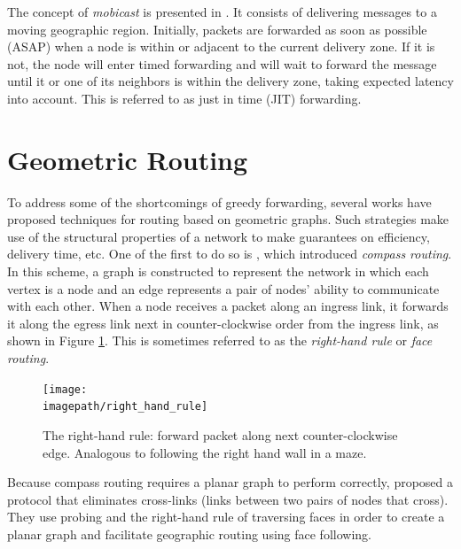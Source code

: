 \documentclass[conference]{IEEEtran}
\newcommand{\imagepath}{../../images/external/location_routing}
\begin{document}
The concept of \emph{mobicast} is presented in \cite{Huang2005}.
It consists of delivering messages to a moving geographic region.
Initially, packets are forwarded as soon as possible (ASAP) when a node is within or adjacent to the current delivery zone.
If it is not, the node will enter timed forwarding and will wait to forward the message until it or one of its neighbors is within the delivery zone, taking expected latency into account.
This is referred to as just in time (JIT) forwarding.



\section{Geometric Routing}

To address some of the shortcomings of greedy forwarding, several works have proposed techniques for routing based on geometric graphs.
Such strategies make use of the structural properties of a network to make guarantees on efficiency, delivery time, etc.
One of the first to do so is \cite{Kranakis99compassrouting}, which introduced \emph{compass routing}.
In this scheme, a graph is constructed to represent the network in which each vertex is a node and an edge represents a pair of nodes' ability to communicate with each other.
When a node receives a packet along an ingress link, it forwards it along the egress link next in counter-clockwise order from the ingress link, as shown in Figure \ref{fig:right-hand-rule}.
This is sometimes referred to as the \emph{right-hand rule} or \emph{face routing}.

\begin{figure}
\label{fig:right-hand-rule}
\centering
\texttt{[image: \\imagepath/right\_hand\_rule]}
\caption{The right-hand rule: forward packet along next counter-clockwise edge. Analogous to following the right hand wall in a maze.}
\end{figure}

Because compass routing requires a planar graph to perform correctly, \cite{Kim:2005:GRM:1251203.1251219} proposed a protocol that eliminates cross-links (links between two pairs of nodes that cross).
They use probing and the right-hand rule of traversing faces in order to create a planar graph and facilitate geographic routing using face following.
\end{document}
